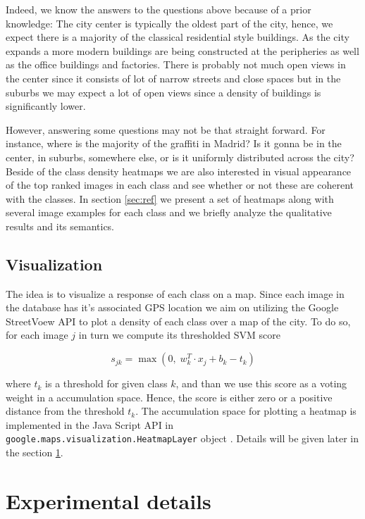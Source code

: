 \documentclass[runningheads, table]{llncs}
\begin{document}
Indeed, we know the answers to the questions above because of a prior knowledge: The city center is typically the oldest part of the city, hence, we expect there is a majority of the classical residential style buildings. As the city expands a more modern buildings are being constructed at the peripheries as well as the office buildings and factories. There is probably not much open views in the center since it consists of lot of narrow streets and close spaces but in the suburbs we may expect a lot of open views since a density of buildings is significantly lower. 

However, answering some questions may not be that straight forward. For instance, where is the majority of the graffiti in Madrid? Is it gonna be in the center, in suburbs, somewhere else, or is it uniformly distributed across the city? Beside of the class density heatmaps we are also interested in visual appearance of the top ranked images in each class and see whether or not these are coherent with the classes. In section \ref{sec:ref} we present a set of heatmaps along with several image examples for each class and we briefly analyze the qualitative results and its semantics. 

\subsection{Visualization}
\vspace{-1mm}
The idea is to visualize a response of each class on a map. Since each image in the database has it's associated GPS location we aim on utilizing the Google StreetVoew API \cite{googleAPI} to plot a density of each class over a map of the city. To do so, for each image $j$ in turn we compute its thresholded SVM score 

\begin{equation}
  s_{jk} = \operatorname{max}\left(0, \; w_k^T \cdot x_j+b_k - t_k\right) 
\end{equation}

\noindent
where $t_k$ is a threshold for given class $k$, and than we use this score as a voting weight in a accumulation space. Hence, the score is either zero or a positive distance from the threshold $t_k$. The accumulation space for plotting a heatmap is implemented in the Java Script API in \texttt{google.maps.vi\-su\-aliza\-tion.Heat\-map\-Layer} object \cite{googleAPI}. Details will be given later in the section \ref{sec:exprm}.

\section{Experimental details}
\label{sec:exprm}
\end{document}
